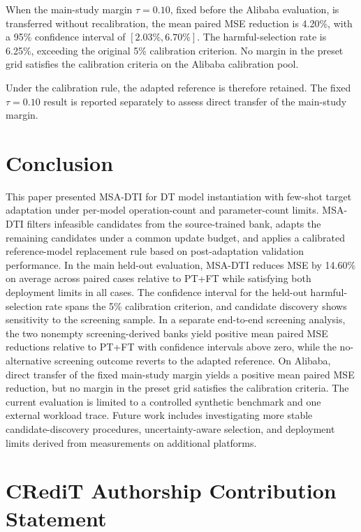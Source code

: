 \documentclass[a4paper,fleqn]{cas-sc}
\begin{document}
When the main-study margin $\tau=0.10$, fixed before the Alibaba evaluation,
is transferred without recalibration, the mean paired MSE reduction is
4.20\%, with a 95\% confidence interval of $[2.03\%,6.70\%]$. The
harmful-selection rate is 6.25\%, exceeding the original 5\% calibration
criterion. No margin in the preset grid satisfies the calibration criteria on
the Alibaba calibration pool.

Under the calibration rule, the adapted reference is therefore retained. The
fixed $\tau=0.10$ result is reported separately to assess direct transfer of
the main-study margin.

\section{Conclusion}
\label{sec:conclusion}

This paper presented MSA-DTI for DT model instantiation with few-shot target
adaptation under per-model operation-count and parameter-count limits. MSA-DTI filters
infeasible candidates from the source-trained bank, adapts the remaining
candidates under a common update budget, and applies a calibrated
reference-model replacement rule based on post-adaptation validation
performance. In the main held-out evaluation, MSA-DTI reduces MSE by 14.60\%
on average across paired cases relative to PT+FT while satisfying both
deployment limits in all cases. The confidence interval for the held-out
harmful-selection rate spans the 5\% calibration criterion, and candidate discovery shows sensitivity to the screening sample. In a separate end-to-end
screening analysis, the two nonempty screening-derived banks yield positive
mean paired MSE reductions relative to PT+FT with confidence intervals above
zero, while the no-alternative screening outcome reverts to the adapted
reference. On
Alibaba, direct transfer of the fixed main-study margin yields a positive mean
paired MSE reduction, but no margin in the preset grid satisfies the
calibration criteria. The current
evaluation is limited to a controlled synthetic benchmark and one external
workload trace. Future work includes investigating more stable
candidate-discovery procedures, uncertainty-aware selection, and deployment
limits derived from measurements on additional platforms.

\section*{CRediT Authorship Contribution Statement}
\end{document}
